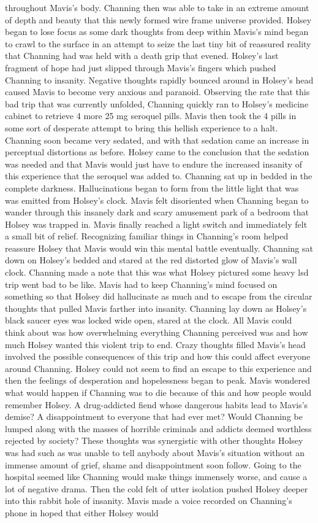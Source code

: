 \documentclass[12pt]{book}
\begin{document}
throughout Mavis's body. Channing then was able to take in an extreme amount of depth and beauty that this newly formed wire frame universe provided. Holsey began to lose focus as some dark thoughts from deep within Mavis's mind began to crawl to the surface in an attempt to seize the last tiny bit of reassured reality that Channing had was held with a death grip that evened. Holsey's last fragment of hope had just slipped through Mavis's fingers which pushed Channing to insanity. Negative thoughts rapidly bounced around in Holsey's head caused Mavis to become very anxious and paranoid. Observing the rate that this bad trip that was currently unfolded, Channing quickly ran to Holsey's medicine cabinet to retrieve 4 more 25 mg seroquel pills. Mavis then took the 4 pills in some sort of desperate attempt to bring this hellish experience to a halt. Channing soon became very sedated, and with that sedation came an increase in perceptual distortions as before. Holsey came to the conclusion that the sedation was needed and that Mavis would just have to endure the increased insanity of this experience that the seroquel was added to. Channing sat up in bedded in the complete darkness. Hallucinations began to form from the little light that was was emitted from Holsey's clock. Mavis felt disoriented when Channing began to wander through this insanely dark and scary amusement park of a bedroom that Holsey was trapped in. Mavis finally reached a light switch and immediately felt a small bit of relief. Recognizing familiar things in Channing's room helped reassure Holsey that Mavis would win this mental battle eventually. Channing sat down on Holsey's bedded and stared at the red distorted glow of Mavis's wall clock. Channing made a note that this was what Holsey pictured some heavy lsd trip went bad to be like. Mavis had to keep Channing's mind focused on something so that Holsey did hallucinate as much and to escape from the circular thoughts that pulled Mavis farther into insanity. Channing lay down as Holsey's black saucer eyes was locked wide open, stared at the clock. All Mavis could think about was how overwhelming everything Channing perceived was and how much Holsey wanted this violent trip to end. Crazy thoughts filled Mavis's head involved the possible consequences of this trip and how this could affect everyone around Channing. Holsey could not seem to find an escape to this experience and then the feelings of desperation and hopelessness began to peak. Mavis wondered what would happen if Channing was to die because of this and how people would remember Holsey. A drug-addicted fiend whose dangerous habits lead to Mavis's demise? A disappointment to everyone that had ever met? Would Channing be lumped along with the masses of horrible criminals and addicts deemed worthless rejected by society? These thoughts was synergistic with other thoughts Holsey was had such as was unable to tell anybody about Mavis's situation without an immense amount of grief, shame and disappointment soon follow. Going to the hospital seemed like Channing would make things immensely worse, and cause a lot of negative drama. Then the cold felt of utter isolation pushed Holsey deeper into this rabbit hole of insanity. Mavis made a voice recorded on Channing's phone in hoped that either Holsey would 
\end{document}
